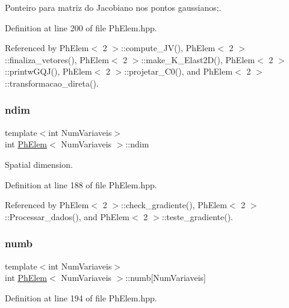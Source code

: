Ponteiro para matriz do Jacobiano nos pontos gaussianos;. 



Definition at line 200 of file Ph\+Elem.\+hpp.



Referenced by Ph\+Elem$<$ 2 $>$\+::compute\+\_\+\+J\+V(), Ph\+Elem$<$ 2 $>$\+::finaliza\+\_\+vetores(), Ph\+Elem$<$ 2 $>$\+::make\+\_\+\+K\+\_\+\+Elast2\+D(), Ph\+Elem$<$ 2 $>$\+::printw\+G\+Q\+J(), Ph\+Elem$<$ 2 $>$\+::projetar\+\_\+\+C0(), and Ph\+Elem$<$ 2 $>$\+::transformacao\+\_\+direta().

\mbox{\label{classPhElem_af3ea3f4193f7d65855c3fabead6f2545}} 
\subsubsection{\texorpdfstring{ndim}{ndim}}
{\footnotesize\ttfamily template$<$int Num\+Variaveis$>$ \\
int \hyperlink{classPhElem}{Ph\+Elem}$<$ Num\+Variaveis $>$\+::ndim\hspace{0.3cm}{\ttfamily [protected]}}



Spatial dimension. 



Definition at line 188 of file Ph\+Elem.\+hpp.



Referenced by Ph\+Elem$<$ 2 $>$\+::check\+\_\+gradiente(), Ph\+Elem$<$ 2 $>$\+::\+Processar\+\_\+dados(), and Ph\+Elem$<$ 2 $>$\+::teste\+\_\+gradiente().

\mbox{\label{classPhElem_ad95c9f8ee7a993ccc7f9cdd08dddf5f6}} 
\subsubsection{\texorpdfstring{numb}{numb}}
{\footnotesize\ttfamily template$<$int Num\+Variaveis$>$ \\
int \hyperlink{classPhElem}{Ph\+Elem}$<$ Num\+Variaveis $>$\+::numb\mbox{[}Num\+Variaveis\mbox{]}\hspace{0.3cm}{\ttfamily [protected]}}



Definition at line 194 of file Ph\+Elem.\+hpp.



